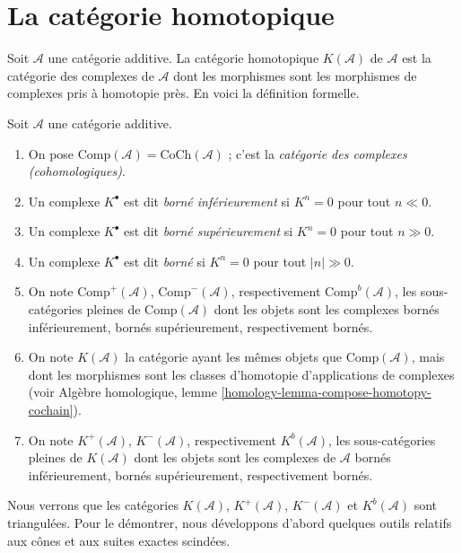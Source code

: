 \section{La catégorie homotopique}
\label{section-homotopy}

\noindent
Soit $\mathcal{A}$ une catégorie additive. La catégorie homotopique
$K(\mathcal{A})$ de $\mathcal{A}$ est la catégorie des complexes de
$\mathcal{A}$ dont les morphismes sont les morphismes de complexes pris à
homotopie près. En voici la définition formelle.

\begin{definition}
\label{definition-complexes-notation}
Soit $\mathcal{A}$ une catégorie additive.
\begin{enumerate}
\item On pose $\text{Comp}(\mathcal{A}) = \text{CoCh}(\mathcal{A})$ ; c'est la
{\it catégorie des complexes (cohomologiques)}.
\item Un complexe $K^\bullet$ est dit {\it borné inférieurement} si
$K^n = 0$ pour tout $n \ll 0$.
\item Un complexe $K^\bullet$ est dit {\it borné supérieurement} si
$K^n = 0$ pour tout $n \gg 0$.
\item Un complexe $K^\bullet$ est dit {\it borné} si
$K^n = 0$ pour tout $|n| \gg 0$.
\item On note
$\text{Comp}^{+}(\mathcal{A})$, $\text{Comp}^{-}(\mathcal{A})$,
respectivement $\text{Comp}^b(\mathcal{A})$, les sous-catégories pleines de
$\text{Comp}(\mathcal{A})$ dont les objets sont les complexes bornés
inférieurement, bornés supérieurement, respectivement bornés.
\item On note $K(\mathcal{A})$ la catégorie ayant les mêmes objets que
$\text{Comp}(\mathcal{A})$, mais dont les morphismes sont les classes
d'homotopie d'applications de complexes (voir Algèbre homologique, lemme
\ref{homology-lemma-compose-homotopy-cochain}).
\item On note $K^{+}(\mathcal{A})$, $K^{-}(\mathcal{A})$,
respectivement $K^b(\mathcal{A})$, les sous-catégories pleines de
$K(\mathcal{A})$ dont les objets sont les complexes de $\mathcal{A}$ bornés
inférieurement, bornés supérieurement, respectivement bornés.
\end{enumerate}
\end{definition}

\noindent
Nous verrons que les catégories $K(\mathcal{A})$, $K^{+}(\mathcal{A})$,
$K^{-}(\mathcal{A})$ et $K^b(\mathcal{A})$ sont triangulées. Pour le démontrer,
nous développons d'abord quelques outils relatifs aux cônes et aux suites
exactes scindées.


